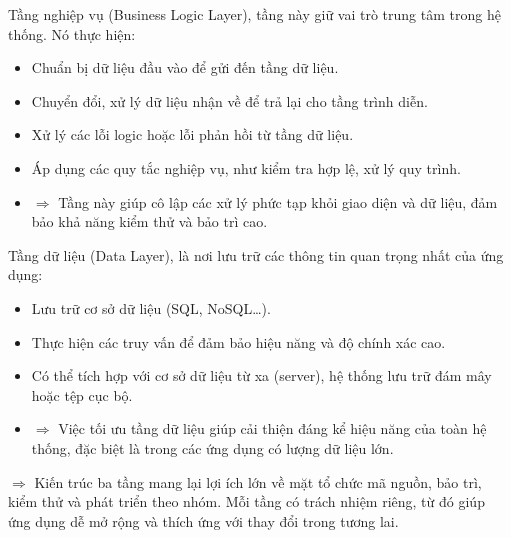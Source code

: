     \begin{flushleft}
      \hspace*{0.8cm}Tầng nghiệp vụ (Business Logic Layer), tầng này giữ vai trò trung tâm trong hệ thống. Nó thực hiện:
      \setlength{\leftmargini}{1.5cm}
      \begin{itemize}
          \item Chuẩn bị dữ liệu đầu vào để gửi đến tầng dữ liệu.
          \item Chuyển đổi, xử lý dữ liệu nhận về để trả lại cho tầng trình diễn.
          \item Xử lý các lỗi logic hoặc lỗi phản hồi từ tầng dữ liệu.
          \item Áp dụng các quy tắc nghiệp vụ, như kiểm tra hợp lệ, xử lý quy trình.
          \item[]$\Rightarrow$ Tầng này giúp cô lập các xử lý phức tạp khỏi giao diện và dữ liệu, đảm bảo khả năng kiểm thử và bảo trì cao.
      \end{itemize}
    \end{flushleft}

    \begin{flushleft}
      \hspace*{0.8cm}Tầng dữ liệu (Data Layer), là nơi lưu trữ các thông tin quan trọng nhất của ứng dụng:
      \setlength{\leftmargini}{1.5cm}
      \begin{itemize}
          \item Lưu trữ cơ sở dữ liệu (SQL, NoSQL…).
          \item Thực hiện các truy vấn để đảm bảo hiệu năng và độ chính xác cao.
          \item Có thể tích hợp với cơ sở dữ liệu từ xa (server), hệ thống lưu trữ đám mây hoặc tệp cục bộ.
          \item[]$\Rightarrow$ Việc tối ưu tầng dữ liệu giúp cải thiện đáng kể hiệu năng của toàn hệ thống, đặc biệt là trong các ứng dụng có lượng dữ liệu lớn.
      \end{itemize}
    \end{flushleft}

    \begin{flushleft}
      \hspace*{0.8cm}$\Rightarrow$ Kiến trúc ba tầng mang lại lợi ích lớn về mặt tổ chức mã nguồn, bảo trì, kiểm thử và phát triển theo nhóm. Mỗi tầng có trách nhiệm riêng, từ đó giúp ứng dụng dễ mở rộng và thích ứng với thay đổi trong tương lai.
    \end{flushleft}

